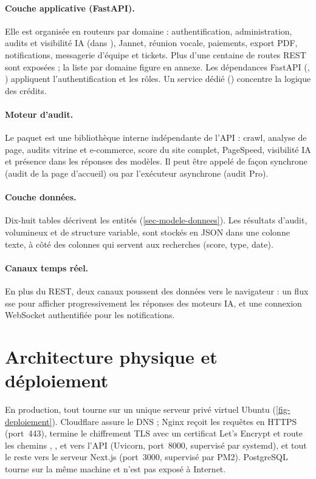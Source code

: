 \paragraph{Couche applicative (FastAPI).} Elle est organisée en routeurs par domaine : authentification, administration, audits et visibilité IA (dans ), Jannet, réunion vocale, paiements, export PDF, notifications, messagerie d'équipe et tickets. Plus d'une centaine de routes REST sont exposées ; la liste par domaine figure en annexe. Les dépendances FastAPI (, ) appliquent l'authentification et les rôles. Un service dédié () concentre la logique des crédits.

\paragraph{Moteur d'audit.} Le paquet  est une bibliothèque interne indépendante de l'API : crawl, analyse de page, audits vitrine et e-commerce, score du site complet, PageSpeed, visibilité IA et présence dans les réponses des modèles. Il peut être appelé de façon synchrone (audit de la page d'accueil) ou par l'exécuteur asynchrone (audit Pro).

\paragraph{Couche données.} Dix-huit tables décrivent les entités (\cref{sec-modele-donnees}). Les résultats d'audit, volumineux et de structure variable, sont stockés en JSON dans une colonne texte, à côté des colonnes qui servent aux recherches (score, type, date).

\paragraph{Canaux temps réel.} En plus du REST, deux canaux poussent des données vers le navigateur : un flux \gls{sse} pour afficher progressivement les réponses des moteurs IA, et une connexion WebSocket authentifiée pour les notifications.

\section{Architecture physique et déploiement}
En production, tout tourne sur un unique serveur privé virtuel Ubuntu (\cref{fig-deploiement}). Cloudflare assure le DNS ; Nginx reçoit les requêtes en HTTPS (port~443), termine le chiffrement TLS avec un certificat Let's Encrypt et route les chemins , ,  et  vers l'API (Uvicorn, port~8000, supervisé par systemd), et tout le reste vers le serveur Next.js (port~3000, supervisé par PM2). PostgreSQL tourne sur la même machine et n'est pas exposé à Internet. 

